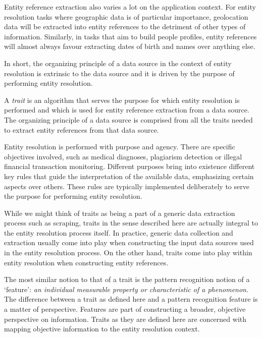 Entity reference extraction also varies a lot on the application context.
For entity resolution tasks where geographic data is of particular importance,
geolocation data will be extracted into entity references to the detriment of
other types of information.
Similarly, in tasks that aim to build people profiles, entity references will
almost always favour extracting dates of birth and names over anything else.

In short, the organizing principle of a data source in the context of entity
resolution is extrinsic to the data source and it is driven by the purpose of
performing entity resolution.

\begin{defn}
    A \textit{trait} is an algorithm that serves the purpose for which entity
    resolution is performed and which is used for entity reference extraction
    from a data source. The organizing principle of a data source is comprised
    from all the traits needed to extract entity references from that data
    source.
\end{defn}

Entity resolution is performed with purpose and agency.
There are specific objectives involved, such as medical diagnoses, plagiarism
detection or illegal financial transaction monitoring.
Different purposes bring into existence different key rules that guide the
interpretation of the available data, emphasizing certain aspects over others.
These rules are typically implemented deliberately to serve the purpose for
performing entity resolution.

While we might think of traits as being a part of a generic data extraction
process such as scraping, traits in the sense described here are actually
integral to the entity resolution process itself.
In practice, generic data collection and extraction usually come into play when
constructing the input data sources used in the entity resolution process.
On the other hand, traits come into play within entity resolution when
constructing entity references.

The most similar notion to that of a trait is the pattern recognition notion of
a `feature':
\textit{an individual measurable property or characteristic of a
phenomenon}\cite{bishop2006pattern}.
The difference between a trait as defined here and a pattern recognition feature
is a matter of perspective.
Features are part of constructing a broader, objective perspective on
information.
Traits as they are defined here are concerned with mapping objective information
to the entity resolution context.

